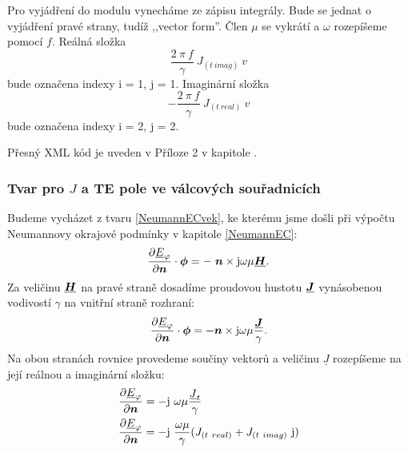 \documentclass[12pt,a4paper,oneside]{article}
\numberwithin{equation}{section} %
\numberwithin{figure}{section} %
\numberwithin{table}{section} %
\newcommand{\mj}{\mathrm{j}} %
\renewcommand{\vec}[1]{\mbox{\boldmath$#1$}} %
\newcommand{\faz}[1]{{\underline{#1}}} %
\begin{document}
Pro vyjádření do modulu vynecháme ze zápisu integrály. Bude se jednat o vyjádření pravé strany, tudíž ,,vector form''. Člen $\mu$ se vykrátí a $\omega$ rozepíšeme pomocí $f$. Reálná složka  
\begin{equation}
\frac{2 ~ \pi ~ f}{\gamma} ~ J_{(t~imag)} ~ v
\end{equation} 
bude označena indexy i = 1, j = 1. Imaginární složka 
\begin{equation}
- \frac{2 ~ \pi ~ f}{\gamma} ~ J_{(t~real)} ~ v
\end{equation}
bude označena indexy i = 2, j = 2.

Přesný XML kód je uveden v Příloze 2 v kapitole .


\subsubsection*{Tvar pro \faz{\vec{J}} a TE pole ve válcových souřadnicích}
Budeme vycházet z tvaru \ref{NeumannECvek}, ke kterému jsme došli při výpočtu Neumannovy okrajové podmínky v kapitole \ref{NeumannEC}:
\begin{equation}
\frac{\partial \faz{E}_{\varphi}}{\partial \vec{n}} \cdot \vec{\phi} = - ~ \vec{n} \times \mj \omega \mu \faz{\vec{H}} .
\end{equation}
Za veličinu $\faz{\vec{H}}$ na pravé straně dosadíme proudovou hustotu $\faz{\vec{J}}$ vynásobenou vodivostí $\gamma$ na vnitřní straně rozhraní:
\begin{equation}
\frac{\partial \faz{E}_{\varphi}}{\partial \vec{n}} \cdot \vec{\phi} = - \vec{n} \times \mj \omega \mu \frac{\faz{\vec{J}}}{\gamma}.
\end{equation}
Na obou stranách rovnice provedeme součiny vektorů a veličinu $\faz{J}$ rozepíšeme na její reálnou a imaginární složku:
\begin{subequations}
\begin{align}
\frac{\partial \faz{E} _{\varphi}}{\partial \vec{n}} &= - \mj ~ \omega \mu \frac{\faz{J} _t}{\gamma}
\\
\frac{\partial \faz{E} _{\varphi}}{\partial \vec{n}} &= - \mj ~ \frac{\omega \mu}{\gamma} (J _{(t~real)} + J _{(t~imag)} ~ \mj)
\end{align}
\end{subequations}
\end{document}
